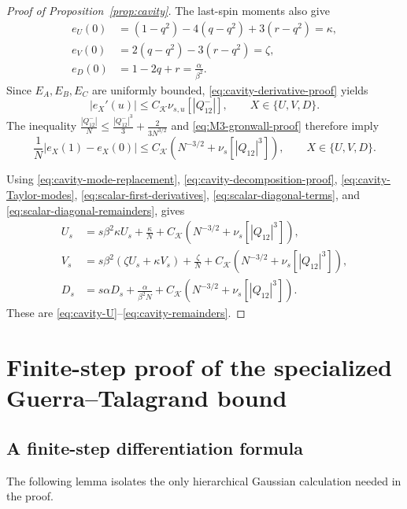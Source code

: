 \documentclass[11pt]{article}
\numberwithin{equation}{section}
\newcommand{\1}{\mathbf 1}
\newcommand{\cK}{\mathcal K}
\begin{document}
\begin{proof}[Proof of Proposition~\ref{prop:cavity}]
The last-spin moments also give
\begin{align}
 e_U(0)&=(1-q^2)-4(q-q^2)+3(r-q^2)=\kappa ,\nonumber\\
 e_V(0)&=2(q-q^2)-3(r-q^2)=\zeta,
 \label{eq:scalar-diagonal-terms}\\
 e_D(0)&=1-2q+r=\frac{\alpha}{\beta^2}.
 \nonumber
\end{align}
Since $E_A,E_B,E_C$ are uniformly bounded,
\eqref{eq:cavity-derivative-proof} yields
\[
 |e_X'(u)|\le C_{\cK}\nu_{s,u}[|Q^-_{12}|],
 \qquad X\in\{U,V,D\}.
\]
The inequality
\(
 \frac{|Q^-_{12}|}{N}
 \le\frac{|Q^-_{12}|^3}{3}+\frac{2}{3N^{3/2}}
\) 
and \eqref{eq:M3-gronwall-proof} therefore imply
\begin{equation}
 \frac1N|e_X(1)-e_X(0)|
 \le C_{\cK}(N^{-3/2}+\nu_s[|Q_{12}|^3]),
 \qquad X\in\{U,V,D\}.
 \label{eq:scalar-diagonal-remainders}
\end{equation}

Using
\eqref{eq:cavity-mode-replacement}, \eqref{eq:cavity-decomposition-proof}, 
\eqref{eq:cavity-Taylor-modes}, \eqref{eq:scalar-first-derivatives},
\eqref{eq:scalar-diagonal-terms}, and
\eqref{eq:scalar-diagonal-remainders}, gives
\begin{align*}
 U_s&=s\beta^2\kappa U_s+\frac{\kappa }N
 +C_{\cK}(N^{-3/2}+\nu_s[|Q_{12}|^3]),\\
 V_s&=s\beta^2(\zeta U_s+\kappa V_s)+\frac{\zeta}N
 +C_{\cK}(N^{-3/2}+\nu_s[|Q_{12}|^3]),\\
 D_s&=s\alpha D_s+\frac{\alpha}{\beta^2N}
 +C_{\cK}(N^{-3/2}+\nu_s[|Q_{12}|^3]).
\end{align*}
These are \eqref{eq:cavity-U}--\eqref{eq:cavity-remainders}.
\end{proof}

\section{Finite-step proof of the specialized Guerra--Talagrand bound}
\label{app:specialGT}



\subsection{A finite-step differentiation formula}

The following lemma isolates the only hierarchical Gaussian calculation
needed in the proof.
\end{document}
